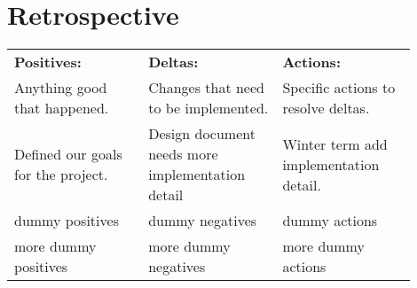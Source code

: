\documentclass[compsoc,draftclsnofoot,onecolumn,10pt]{IEEEtran}
\begin{document}
\section{Retrospective}

    
	\begin{center}
		\begin{tabular}{|p{0.3\linewidth}|p{0.3\linewidth}|p{0.3\linewidth}|}
			\hline
			\textbf{Positives:} & \textbf{Deltas:} & \textbf{Actions:}\\
			
            Anything good that happened. & Changes that need to be implemented. & Specific actions to resolve deltas.\\
			\hline

			Defined our goals for the project. & Design document needs more implementation detail & Winter term add implementation detail.\\
			\hline
			dummy positives & dummy negatives & dummy actions\\
			\hline
			more dummy positives & more dummy negatives & more dummy actions\\
			\hline
			
		\end{tabular}
	\end{center}
\end{document}
